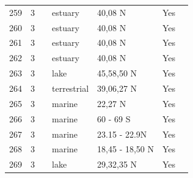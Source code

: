 \documentclass[12pt]{article}
\begin{document}
\begin{landscape}
\begin{table}[h!]
{\begin{tabular}{p{2.8cm}p{1.3cm}p{5.5cm}p{2.2cm}p{2.5cm}lp{3.5cm}}
        259   & 3 & \cite{Baeta2011}  & estuary & 40,08 N & Yes   &       \\
        260   & 3 & \cite{Baeta2011}  & estuary & 40,08 N & Yes   &       \\
        261   & 3 & \cite{Baeta2011}  & estuary & 40,08 N & Yes   &       \\
        262   & 3 & \cite{Baeta2011}  & estuary & 40,08 N & Yes   &       \\
        263   & 3 & \cite{Schneider1997}    & lake  & 45,58,50 N & Yes   &       \\
        264   & 3 & \cite{Stagliano2002}    & terrestrial & 39,06,27 N & Yes   &       \\
        265   & 3 & \cite{Lin2006}  & marine & 22,27 N & Yes   &       \\
        266   & 3 & \cite{Cornejo-Donoso2008}  & marine & 60 - 69 S & Yes   &       \\
        267   & 3 & \cite{Zetina-Rejon2003}  & marine & 23.15 - 22.9N & Yes   &       \\
        268   & 3 & \cite{Cruz-Escalona2007}  & marine & 18,45 - 18,50 N & Yes   &       \\
        269   & 3 & \cite{Liu2007}  & lake  & 29,32,35 N & Yes   &       \\
         \hline
      \end{tabular}}%
      \end{table}

        \newpage


\end{landscape}
\end{document}
